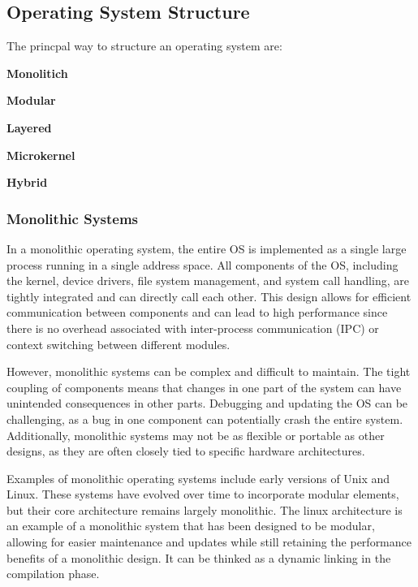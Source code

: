 \subsection{Operating System Structure}

    The princpal way to structure an operating system are:
    \begin{compactitemize}
        \item \textbf{Monolitich}
        \item \textbf{Modular}
        \item \textbf{Layered}
        \item \textbf{Microkernel}
        \item \textbf{Hybrid}
    \end{compactitemize}


\subsubsection{Monolithic Systems}

    In a monolithic operating system, the entire OS is implemented as a single large process running in a single address space. All components of the OS, including the kernel, device drivers, file system management, and system call handling, are tightly integrated and can directly call each other. This design allows for efficient communication between components and can lead to high performance since there is no overhead associated with inter-process communication (IPC) or context switching between different modules.
    
    However, monolithic systems can be complex and difficult to maintain. The tight coupling of components means that changes in one part of the system can have unintended consequences in other parts. Debugging and updating the OS can be challenging, as a bug in one component can potentially crash the entire system. Additionally, monolithic systems may not be as flexible or portable as other designs, as they are often closely tied to specific hardware architectures.
    
    Examples of monolithic operating systems include early versions of Unix and Linux. These systems have evolved over time to incorporate modular elements, but their core architecture remains largely monolithic.
    The linux architecture is an example of a monolithic system that has been designed to be modular, allowing for easier maintenance and updates while still retaining the performance benefits of a monolithic design. It can be thinked as a dynamic linking in the compilation phase.



